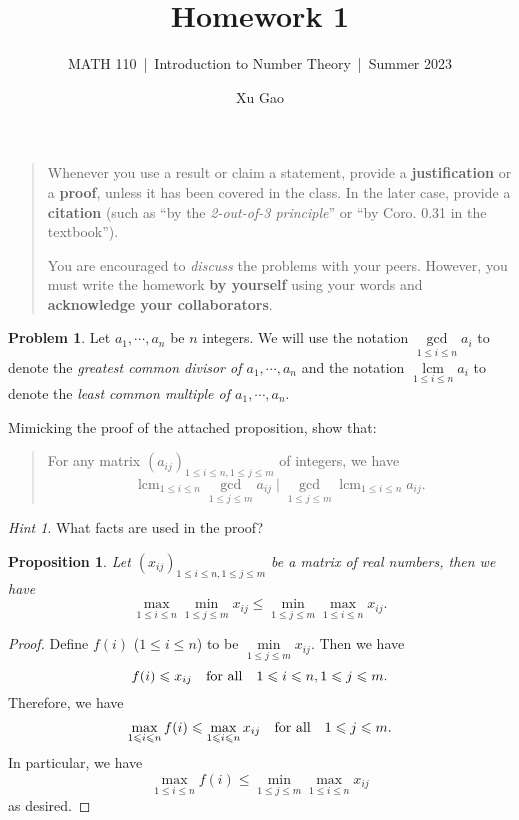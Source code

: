 \documentclass[11pt]{article}
\title{Homework 1}
\author{Xu Gao}
\subtitle{MATH 110~|~Introduction to Number Theory~|~Summer 2023}
\date{}
\theoremstyle{plain}
\newtheorem*{propstar}{Proposition}
\theoremstyle{definition}
\newtheorem{problem}{Problem}
\theoremstyle{remark}
\newtheorem*{hint}{Hint}
\numberwithin{equation}{problem}
\DeclareMathOperator*\lcm{lcm}
\begin{document}
\maketitle

\begin{quotation}
	Whenever you use a result or claim a statement, provide a \textbf{justification} or a \textbf{proof}, unless it has been covered in the class. In the later case, provide a \textbf{citation} (such as ``by the \emph{2-out-of-3 principle}'' or ``by Coro. 0.31 in the textbook'').

	You are encouraged to \emph{discuss} the problems with your peers. However, you must write the homework \textbf{by yourself} using your words and \textbf{acknowledge your collaborators}.
\end{quotation}
\vspace*{1em}

\begin{problem}
	Let $a_1,\cdots,a_n$ be $n$ integers. We will use the notation $\gcd\limits_{1\le i\le n}a_i$ to denote the \emph{greatest common divisor of $a_1,\cdots,a_n$} and the notation $\lcm\limits_{1\le i\le n}a_i$ to denote the \emph{least common multiple of $a_1,\cdots,a_n$}. 
	
	
	Mimicking the proof of the attached proposition, show that: 
	\begin{quote}
		For any matrix $(a_{ij})_{1\le i\le n, 1\le j\le m}$ of integers, we have 
		\[
			\lcm_{1\le i\le n}\gcd_{1\le j\le m} a_{ij} \mid 
			\gcd_{1\le j\le m}\lcm_{1\le i\le n} a_{ij}.
		\]
	\end{quote}
	\begin{hint}
		What facts are used in the proof?
	\end{hint}
	\begin{tcolorbox}
		\begin{propstar}\label{prop}
			Let $(x_{ij})_{1\le i\le n, 1\le j\le m}$ be a matrix of real numbers, then we have 
			\[
				\max_{1\le i\le n}\min_{1\le j\le m} x_{ij} \le 
				\min_{1\le j\le m}\max_{1\le i\le n} x_{ij}.
			\]
		\end{propstar}
		\begin{proof}
			Define $f(i)$ ($1\le i\le n$) to be $\min\limits_{1\le j\le m}x_{ij}$. Then we have 
			\[
				f(i) \leqslant x_{ij} \quad\text{for all}\quad 1\leqslant i\leqslant n, 1\leqslant j\leqslant m.
			\]
			Therefore, we have 
			\[
				\max_{1\leqslant i\leqslant n}f(i) \leqslant \max_{1\leqslant i\leqslant n} x_{ij} 
				\quad\text{for all}\quad 1\leqslant j\leqslant m.
			\]
			In particular, we have 
			\[
				\max_{1\le i\le n}f(i) \le \min_{1\le j\le m}\max_{1\le i\le n} x_{ij}
			\]
			as desired.
		\end{proof}
	\end{tcolorbox}
\end{problem}
\vspace*{1em}
\end{document}
